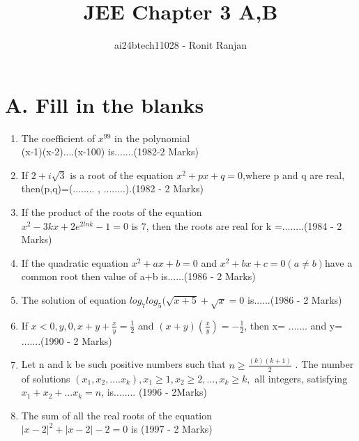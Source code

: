\documentclass[journal,12pt,twocolumn]{IEEEtran}
\theoremstyle{remark}
\begin{document}

\vspace{3cm}

\title{JEE Chapter 3 A,B}
\author{ai24btech11028 - Ronit Ranjan}
\maketitle
\newpage
\bigskip
\section*{A. Fill in the blanks}
\begin{enumerate}
    \item The coefficient of $x^{99}$ in the polynomial\\ (x-1)(x-2)....(x-100) is.......\hfill (1982-2 Marks)
      
    \item If $2+i\sqrt{3}$ is a root of the equation $x^2 + px +q =0$,where p and q are real, then(p,q)=(........ , ........).\hfill (1982 - 2 Marks)
    
    \item If the product of the roots of the equation\\ $x^2 -3kx +2e^{2lnk} -1=0$ is $7$, then the roots are real for k =........\hfill (1984 - 2 Marks)
    
    \item If the quadratic equation $x^2 + ax +b=0$ and $x^2 + bx + c=0 (a \ne b)$have a common root then value of a+b is......\hfill (1986 - 2 Marks)
    
    \item The solution of equation $log_{7}log_{5}(\sqrt{x+5}+\sqrt{x} = 0$ is......\hfill (1986 - 2 Marks)
    
    \item If $x<0, y,0, x + y + \frac{x}{y} = \frac{1}{2}$ and $(x+y)(\frac{x
    }{y}) = -\frac{1}{2}$, then x= ....... and y= .......\hfill (1990 - 2 Marks)
    
    \item Let n and k be such positive numbers such that $n \geq \frac{(k)(k+1)}{2}$ . The number of solutions $(x_1,x_2,....x_k), x_1 \geq 1, x_2 \geq 2,...,x_k \geq k, $ all integers, satisfying $x_1+x_2+...x_k = n$, is........  \hfill (1996 - 2Marks) 
    \item The sum of all the real roots of the equation\\$|x-2|^2+|x-2|-2 = 0$ is \hfill (1997 - 2 Marks)
\end{enumerate}
\end{document}
